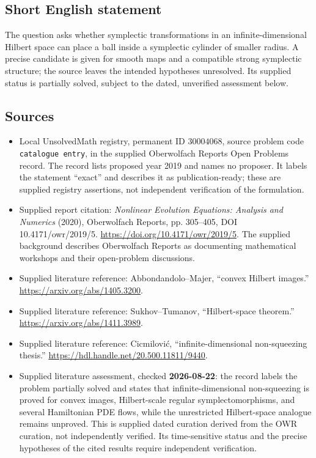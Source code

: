 \documentclass[11pt]{article}
\begin{document}
\subsection{Short English statement}
The question asks whether symplectic transformations in an infinite-dimensional Hilbert space can place a ball inside a symplectic cylinder of smaller radius. A precise candidate is given for smooth maps and a compatible strong symplectic structure; the source leaves the intended hypotheses unresolved. Its supplied status is partially solved, subject to the dated, unverified assessment below.
\subsection{Sources}
\begin{itemize}
\item Local UnsolvedMath registry, permanent ID \(30004068\), source problem code \texttt{catalogue entry}, in the supplied Oberwolfach Reports Open Problems record. The record lists proposed year 2019 and names no proposer. It labels the statement ``exact'' and describes it as publication-ready; these are supplied registry assertions, not independent verification of the formulation.
\item Supplied report citation: \emph{Nonlinear Evolution Equations: Analysis and Numerics} (2020), Oberwolfach Reports, pp. 305--405, DOI 10.4171/owr/2019/5. \url{https://doi.org/10.4171/owr/2019/5}. The supplied background describes Oberwolfach Reports as documenting mathematical workshops and their open-problem discussions.
\item Supplied literature reference: Abbondandolo--Majer, ``convex Hilbert images.'' \url{https://arxiv.org/abs/1405.3200}.
\item Supplied literature reference: Sukhov--Tumanov, ``Hilbert-space theorem.'' \url{https://arxiv.org/abs/1411.3989}.
\item Supplied literature reference: Cicmilovi\'c, ``infinite-dimensional non-squeezing thesis.'' \url{https://hdl.handle.net/20.500.11811/9440}.
\item Supplied literature assessment, checked \textbf{2026-08-22}: the record labels the problem partially solved and states that infinite-dimensional non-squeezing is proved for convex images, Hilbert-scale regular symplectomorphisms, and several Hamiltonian PDE flows, while the unrestricted Hilbert-space analogue remains unproved. This is supplied dated curation derived from the OWR curation, not independently verified. Its time-sensitive status and the precise hypotheses of the cited results require independent verification.
\end{itemize}
\end{document}
